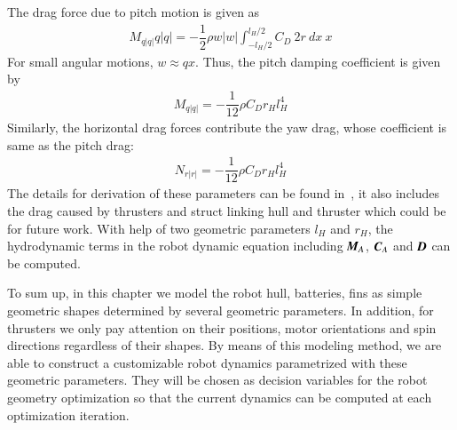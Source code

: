 The drag force due to pitch motion is given as
\begin{align}
M_{q|q|}q|q|=-\dfrac{1}{2}\rho w|w| \int^{l_{H}/2}_{-l_{H}/2}C_{D}~2r~dx~x
\end{align}
For small angular motions, $w\approx q x$. Thus, the pitch damping coefficient is given by
\begin{align}
M_{q|q|}=-\dfrac{1}{12}\rho C_{D} r_{H}l_{H}^{4}
\end{align}
Similarly, the horizontal drag forces contribute the yaw drag, whose coefficient is same as the pitch drag:
\begin{align}
N_{r|r|}=-\dfrac{1}{12}\rho C_{D} r_{H}l_{H}^{4}
\end{align}
The details for derivation of these parameters can be found in~\cite{Sia1999}, it also includes the drag caused by thrusters and struct linking hull and thruster which could be for future work. With help of two geometric parameters $l_{H}$ and $r_{H}$, the hydrodynamic terms in the robot dynamic equation including $\emph{\textbf{M}}_{A}$, $\emph{\textbf{C}}_{A}$ and $\emph{\textbf{D}}$ can be computed.

To sum up, in this chapter we model the robot hull, batteries, fins as simple geometric shapes determined by several geometric parameters. In addition, for thrusters we only pay attention on their positions, motor orientations and spin directions regardless of their shapes. By means of this modeling method, we are able to construct a customizable robot dynamics parametrized with these geometric parameters. They will be chosen as decision variables for the robot geometry optimization so that the current dynamics can be computed at each optimization iteration. 
